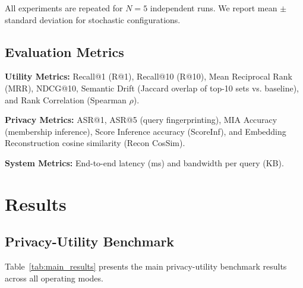 \documentclass[conference]{IEEEtran}
\begin{document}
All experiments are repeated for $N=5$ independent runs. We report mean $\pm$ standard deviation for stochastic configurations.

\subsection{Evaluation Metrics}

\textbf{Utility Metrics:} Recall@1 (R@1), Recall@10 (R@10), Mean Reciprocal Rank (MRR), NDCG@10, Semantic Drift (Jaccard overlap of top-10 sets vs. baseline), and Rank Correlation (Spearman $\rho$).

\textbf{Privacy Metrics:} ASR@1, ASR@5 (query fingerprinting), MIA Accuracy (membership inference), Score Inference accuracy (ScoreInf), and Embedding Reconstruction cosine similarity (Recon CosSim).

\textbf{System Metrics:} End-to-end latency (ms) and bandwidth per query (KB).

\section{Results}
\label{sec:results}

\subsection{Privacy-Utility Benchmark}

Table~\ref{tab:main_results} presents the main privacy-utility benchmark results across all operating modes.
\end{document}

